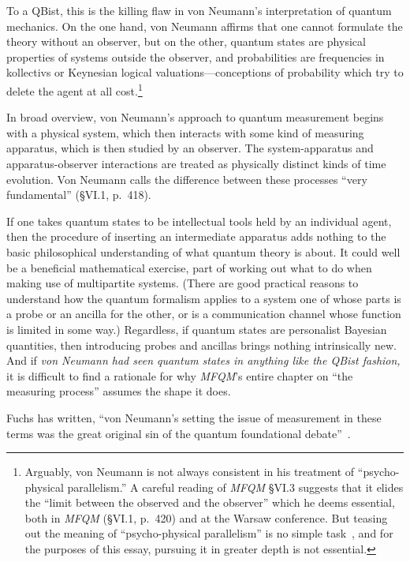 \documentclass[aps,pra,superscriptaddress,12pt,tightenlines,nofootinbib]{revtex4}
\newcommand{\MFQM}{\textsl{MFQM}}
\begin{document}
To a QBist, this is the killing flaw in von Neumann's interpretation
of quantum mechanics.  On the one hand, von Neumann affirms that one
cannot formulate the theory without an observer, but on the other,
quantum states are physical properties of systems outside the
observer, and probabilities are frequencies in kollectivs or Keynesian
logical valuations---conceptions of probability which try to delete
the agent at all cost.\footnote{Arguably, von Neumann is not always
  consistent in his treatment of ``psycho-physical parallelism.''  A
  careful reading of \MFQM{} \S VI.3 suggests that it elides the
  ``limit between the observed and the observer'' which he deems
  essential, both in \MFQM{} (\S VI.1, p.\ 420) and at the Warsaw
  conference.  But teasing out the meaning of ``psycho-physical
  parallelism'' is no simple task~\cite{HayPeres1998}, and for the
  purposes of this essay, pursuing it in greater depth is not
  essential.}



In broad overview, von Neumann's approach to quantum measurement
begins with a physical system, which then interacts with some kind of
measuring apparatus, which is then studied by an observer.  The
system-apparatus and apparatus-observer interactions are treated as
physically distinct kinds of time evolution.  Von Neumann calls the
difference between these processes ``very fundamental'' (\S VI.1,
p.\ 418).

If one takes quantum states to be intellectual tools held by an
individual agent, then the procedure of inserting an intermediate
apparatus adds nothing to the basic philosophical understanding of
what quantum theory is about.  It could well be a beneficial
mathematical exercise, part of working out what to do when making use
of multipartite systems.  (There are good practical reasons to
understand how the quantum formalism applies to a system one of whose
parts is a probe or an ancilla for the other, or is a communication
channel whose function is limited in some way.)  Regardless, if quantum
states are personalist Bayesian quantities, then introducing probes
and ancillas brings nothing intrinsically new.  And if \emph{von
  Neumann had seen quantum states in anything like the QBist fashion,}
it is difficult to find a rationale for why \MFQM's entire chapter on
``the measuring process'' assumes the shape it does.

Fuchs has written, ``von Neumann's setting the issue of measurement in
these terms was the great original sin of the quantum foundational
debate''~\cite[p.\ 2035]{Fuchs2014}.
\end{document}
